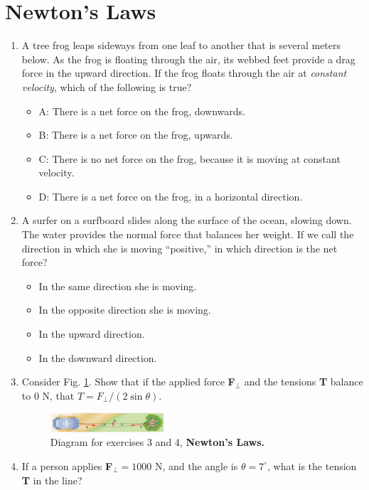 \documentclass[10pt]{article}
\begin{document}
\section{Newton's Laws}
\begin{enumerate}
\item A tree frog leaps sideways from one leaf to another that is several meters below.  As the frog is floating through the air, its webbed feet provide a drag force in the upward direction.  If the frog floats through the air at \textit{constant velocity}, which of the following is true?
\begin{itemize}
\item A: There is a net force on the frog, downwards.
\item B: There is a net force on the frog, upwards.
\item C: There is no net force on the frog, because it is moving at constant velocity.
\item D: There is a net force on the frog, in a horizontal direction.
\end{itemize}
\item A surfer on a surfboard slides along the surface of the ocean, slowing down.  The water provides the normal force that balances her weight.  If we call the direction in which she is moving ``positive,'' in which direction is the net force?
\begin{itemize}
\item In the same direction she is moving.
\item In the opposite direction she is moving.
\item In the upward direction.
\item In the downward direction.
\end{itemize}
\item Consider Fig. \ref{fig:car_pull}.  Show that if the applied force \textbf{F}$_{\perp}$ and the tensions \textbf{T} balance to 0 N, that $T = F_{\perp}/(2\sin\theta)$. \vspace{2cm}
\begin{figure}[ht]
\centering
\includegraphics[width=0.4\textwidth]{figures/carpull.png}
\caption{\label{fig:car_pull} Diagram for exercises 3 and 4, \textbf{Newton's Laws.}}
\end{figure}
\item If a person applies \textbf{F}$_{\perp} = 1000$ N, and the angle is $\theta=7^{\circ}$, what is the tension \textbf{T} in the line?  \vspace{2cm}

\end{enumerate}
\end{document}
